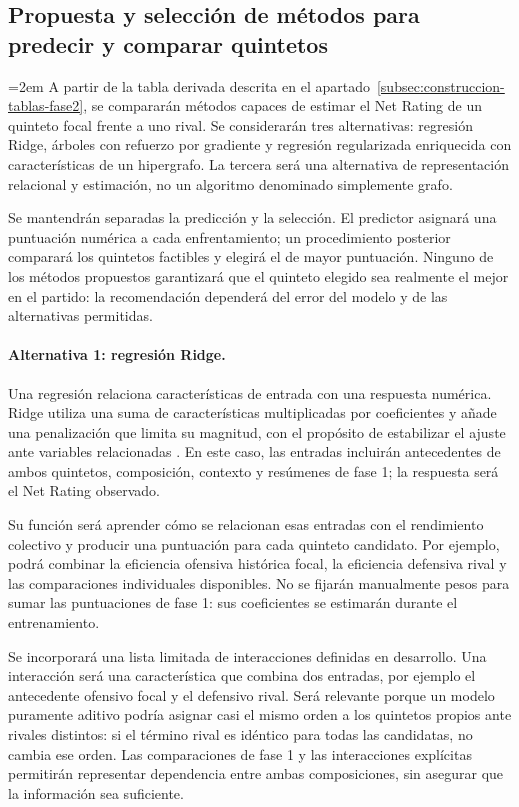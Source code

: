 \subsection{Propuesta y selección de métodos para predecir y comparar quintetos}
\label{subsec:algoritmos-fase2}
\begingroup
\emergencystretch=2em
A partir de la tabla derivada descrita en el apartado~\ref{subsec:construccion-tablas-fase2}, se compararán métodos capaces de estimar el Net Rating de un quinteto focal frente a uno rival. Se considerarán tres alternativas: regresión Ridge, árboles con refuerzo por gradiente y regresión regularizada enriquecida con características de un hipergrafo. La tercera será una alternativa de representación relacional y estimación, no un algoritmo denominado simplemente grafo.

Se mantendrán separadas la predicción y la selección. El predictor asignará una puntuación numérica a cada enfrentamiento; un procedimiento posterior comparará los quintetos factibles y elegirá el de mayor puntuación. Ninguno de los métodos propuestos garantizará que el quinteto elegido sea realmente el mejor en el partido: la recomendación dependerá del error del modelo y de las alternativas permitidas.

\paragraph*{Alternativa 1: regresión Ridge.}
Una regresión relaciona características de entrada con una respuesta numérica. Ridge utiliza una suma de características multiplicadas por coeficientes y añade una penalización que limita su magnitud, con el propósito de estabilizar el ajuste ante variables relacionadas \cite{hoerl1970ridge,sklearnRidge616}. En este caso, las entradas incluirán antecedentes de ambos quintetos, composición, contexto y resúmenes de fase 1; la respuesta será el Net Rating observado.

Su función será aprender cómo se relacionan esas entradas con el rendimiento colectivo y producir una puntuación para cada quinteto candidato. Por ejemplo, podrá combinar la eficiencia ofensiva histórica focal, la eficiencia defensiva rival y las comparaciones individuales disponibles. No se fijarán manualmente pesos para sumar las puntuaciones de fase 1: sus coeficientes se estimarán durante el entrenamiento.

Se incorporará una lista limitada de interacciones definidas en desarrollo. Una interacción será una característica que combina dos entradas, por ejemplo el antecedente ofensivo focal y el defensivo rival. Será relevante porque un modelo puramente aditivo podría asignar casi el mismo orden a los quintetos propios ante rivales distintos: si el término rival es idéntico para todas las candidatas, no cambia ese orden. Las comparaciones de fase 1 y las interacciones explícitas permitirán representar dependencia entre ambas composiciones, sin asegurar que la información sea suficiente.

